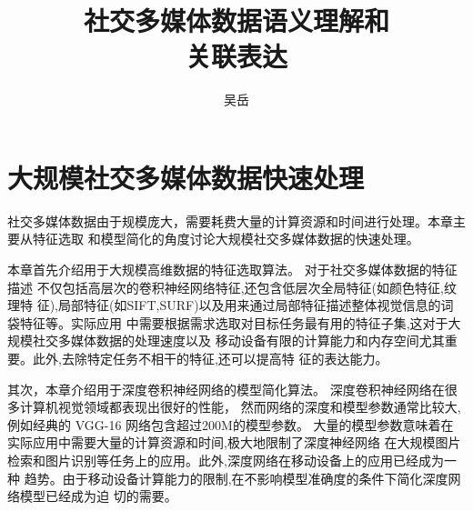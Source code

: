 \documentclass[doctor]{ustcthesis}
\title{社交多媒体数据语义理解和\\关联表达}
\author{吴岳}
\begin{document}
\maketitle

%
%
%

\frontmatter



\tableofcontents
\listoffigures
\listoftables
\listofalgorithms  %
% 

\mainmatter





\chapter{大规模社交多媒体数据快速处理}
社交多媒体数据由于规模庞大，需要耗费大量的计算资源和时间进行处理。本章主要从特征选取
和模型简化的角度讨论大规模社交多媒体数据的快速处理。

本章首先介绍用于大规模高维数据的特征选取算法。 对于社交多媒体数据的特征描述
不仅包括高层次的卷积神经网络特征,还包含低层次全局特征(如颜色特征,纹理特
征),局部特征(如SIFT,SURF)以及用来通过局部特征描述整体视觉信息的词袋特征等。实际应用
中需要根据需求选取对目标任务最有用的特征子集,这对于大规模社交多媒体数据的处理速度以及
移动设备有限的计算能力和内存空间尤其重要。此外,去除特定任务不相干的特征,还可以提高特
征的表达能力。

其次，本章介绍用于深度卷积神经网络的模型简化算法。
深度卷积神经网络在很多计算机视觉领域都表现出很好的性能，
然而网络的深度和模型参数通常比较大,例如经典的 VGG-16 网络包含超过200M的模型参数。
大量的模型参数意味着在实际应用中需要大量的计算资源和时间,极大地限制了深度神经网络
在大规模图片检索和图片识别等任务上的应用。此外,深度网络在移动设备上的应用已经成为一种
趋势。由于移动设备计算能力的限制,在不影响模型准确度的条件下简化深度网络模型已经成为迫
切的需要。
\end{document}
